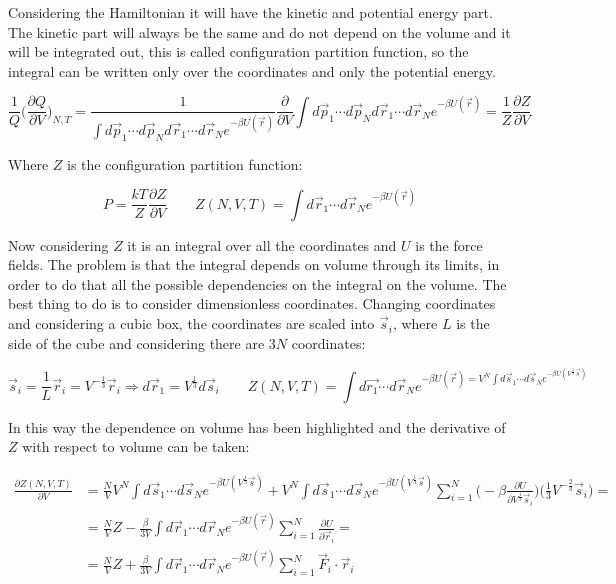 	Considering the Hamiltonian it will have the kinetic and potential energy part.
	The kinetic part will always be the same and do not depend on the volume and it will be integrated out, this is called configuration partition function, so the integral can be written only over the coordinates and only the potential energy.

	$$\frac{1}{Q}\biggl(\frac{\partial Q}{\partial V}\biggr)_{N, T} = \frac{1}{\int d\vec{p}_1\cdots d\vec{p}_Nd\vec{r}_1\cdots d\vec{r}_Ne^{-\beta U(\vec{r})}}\frac{\partial}{\partial V}\int d\vec{p}_1\cdots d\vec{p}_Nd\vec{r}_1\cdots d\vec{r}_N e^{-\beta U(\vec{r})} = \frac{1}{Z}\frac{\partial Z}{\partial V}$$

	Where $Z$ is the configuration partition function:

	$$P = \frac{kT}{Z}\frac{\partial Z}{\partial V}\qquad Z(N, V, T) = \int d\vec{r}_1\cdots d\vec{r}_Ne^{-\beta U(\vec{r})}$$

	Now considering $Z$ it is an integral over all the coordinates and $U$ is the force fields.
	The problem is that the integral depends on volume through its limits, in order to do that all the possible dependencies on the integral on the volume.
	The best thing to do is to consider dimensionless coordinates.
	Changing coordinates and considering a cubic box, the coordinates are scaled into $\vec{s}_i$, where $L$ is the side of the cube and considering there are $3N$ coordinates:

	$$\vec{s}_i = \frac{1}{L}\vec{r}_i = V^{-\frac{1}{3}}\vec{r}_i \Rightarrow d\vec{r}_1 = V^{\frac{1}{3}}d\vec{s}_i\qquad Z(N, V, T) = \int d\vec{r_1}\cdots d\vec{r}_Ne^{-\beta U(\vec{r}) = V^N\int d\vec{s}_1\cdots d\vec{s}_Ne^{-\beta U(V^{\frac{1}{3}}\vec{s})}}$$

	In this way the dependence on volume has been highlighted and the derivative of $Z$ with respect to volume can be taken:

	\begin{align*}
		\frac{\partial Z(N, V, T)}{\partial V} &= \frac{N}{V}V^N\int d\vec{s}_1\cdots d\vec{s}_Ne^{-\beta U(V^{\frac{1}{3}}\vec{s})} + V^N\int d\vec{s}_1\cdots d\vec{s}_Ne^{-\beta U(V^{\frac{1}{3}}\vec{s})}\sum\limits_{i=1}^N\biggl(-\beta\frac{\partial U}{\partial V^{\frac{1}{3}}\vec{s}_i}\biggr)\biggl(\frac{1}{3}V^{-\frac{2}{3}}\vec{s}_i\biggr) = \\
																					 &=\frac{N}{V}Z - \frac{\beta}{3V}\int d\vec{r}_1\cdots d\vec{r}_Ne^{-\beta U(\vec{r})}\sum\limits_{i=1}^N\frac{\partial U}{\partial\vec{r}_i} =\\
																					 &=\frac{N}{V}Z + \frac{\beta}{3V}\int d\vec{r}_1\cdots d\vec{r}_Ne^{-\beta U(\vec{r})}\sum\limits_{i=1}^N\vec{F}_i\cdot\vec{r}_i
	\end{align*}

